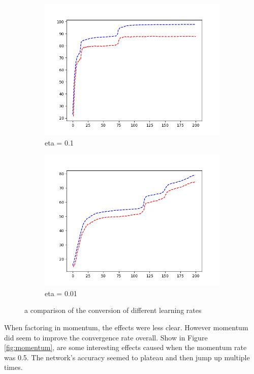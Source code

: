 \documentclass{article}
\begin{document}
\begin{figure}[h]
\centering
\begin{subfigure}{.5\textwidth}
  \centering
  \includegraphics[width=.8\linewidth]{eta01ac.png}
  \caption{eta = 0.1}
  \label{fig:sub1}
\end{subfigure}%
\begin{subfigure}{.5\textwidth}
  \centering
  \includegraphics[width=.8\linewidth]{eta001ac.png}
  \caption{eta = 0.01}
  \label{fig:sub2}
\end{subfigure}
\caption{a comparison of the conversion of different learning rates}
\label{fig:eta}
\end{figure}
 When factoring in momentum, the effects were less clear. However momentum did seem to improve the convergence rate overall. Show in Figure \ref{fig:momentum}, are some interesting effects caused when the momentum rate was 0.5. The network's accuracy seemed to plateau and then jump up multiple times.
\end{document}
